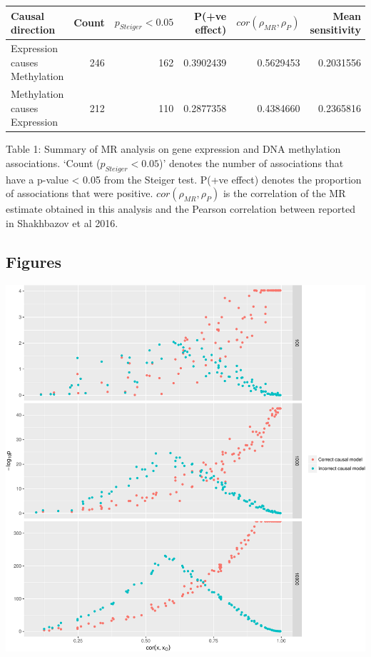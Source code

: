 \documentclass[]{article}
\begin{document}
\begin{longtable}[]{@{}lrrrrr@{}}
\toprule
Causal direction & Count & \(p_{Steiger} < 0.05\) & P(+ve effect) &
\(cor(\rho_{MR}, \rho_{P})\) & Mean sensitivity\tabularnewline
\midrule
\endhead
Expression causes Methylation & 246 & 162 & 0.3902439 & 0.5629453 &
0.2031556\tabularnewline
Methylation causes Expression & 212 & 110 & 0.2877358 & 0.4384660 &
0.2365816\tabularnewline
\bottomrule
\end{longtable}

Table 1: Summary of MR analysis on gene expression and DNA methylation
associations. `Count (\(p_{Steiger} < 0.05\))' denotes the number of
associations that have a p-value \textless{} 0.05 from the Steiger test.
P(+ve effect) denotes the proportion of associations that were positive.
\(cor(\rho_{MR}, \rho_{P})\) is the correlation of the MR estimate
obtained in this analysis and the Pearson correlation between reported
in Shakhbazov et al 2016.

\newpage

\subsection{Figures}\label{figures}

\includegraphics{manuscript_files/figure-latex/cit_measurement_error_figure-1.pdf}
\end{document}
